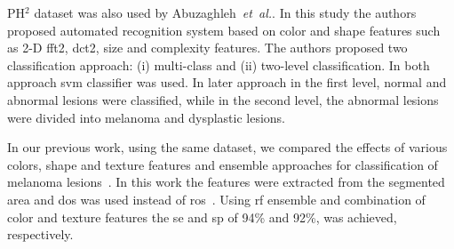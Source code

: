 PH$^{2}$ dataset was also used by Abuzaghleh~\emph{et~al.}\cite{abuzaghleh2014automated}.
In this study the authors proposed automated recognition system based on color and shape features such as 2-D \ac{fft2}, \ac{dct2}, size and complexity features.
The authors proposed two classification approach: (i) multi-class and (ii) two-level classification.
In both approach \ac{svm} classifier was used.
In later approach in the first level, normal and abnormal lesions were classified, while in the second level, the abnormal lesions were divided into melanoma and dysplastic lesions.

In our previous work, using the same dataset, we compared the effects of various colors, shape and texture features and ensemble approaches for classification of melanoma lesions~\cite{rastgoo2015ensemble}.
In this work the features were extracted from the segmented area and \ac{dos} was used instead of \ac{ros}~\cite{rastgoo2015ensemble}.
Using \ac{rf} ensemble and combination of color and texture features the \ac{se} and \ac{sp} of 94\% and 92\%, was achieved, respectively.



